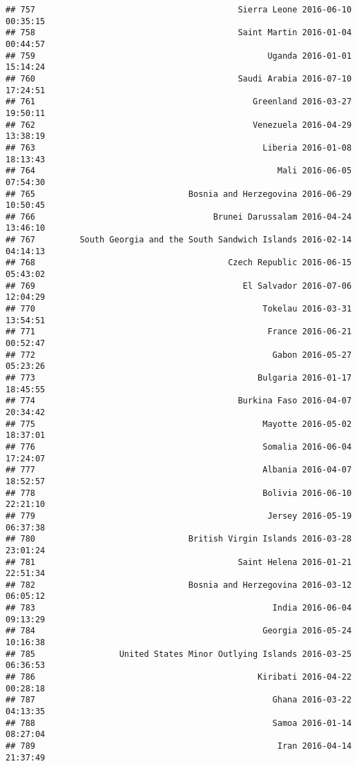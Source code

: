 \documentclass[
]{article}
\begin{document}
\begin{verbatim}
## 757                                         Sierra Leone 2016-06-10 00:35:15
## 758                                         Saint Martin 2016-01-04 00:44:57
## 759                                               Uganda 2016-01-01 15:14:24
## 760                                         Saudi Arabia 2016-07-10 17:24:51
## 761                                            Greenland 2016-03-27 19:50:11
## 762                                            Venezuela 2016-04-29 13:38:19
## 763                                              Liberia 2016-01-08 18:13:43
## 764                                                 Mali 2016-06-05 07:54:30
## 765                               Bosnia and Herzegovina 2016-06-29 10:50:45
## 766                                    Brunei Darussalam 2016-04-24 13:46:10
## 767         South Georgia and the South Sandwich Islands 2016-02-14 04:14:13
## 768                                       Czech Republic 2016-06-15 05:43:02
## 769                                          El Salvador 2016-07-06 12:04:29
## 770                                              Tokelau 2016-03-31 13:54:51
## 771                                               France 2016-06-21 00:52:47
## 772                                                Gabon 2016-05-27 05:23:26
## 773                                             Bulgaria 2016-01-17 18:45:55
## 774                                         Burkina Faso 2016-04-07 20:34:42
## 775                                              Mayotte 2016-05-02 18:37:01
## 776                                              Somalia 2016-06-04 17:24:07
## 777                                              Albania 2016-04-07 18:52:57
## 778                                              Bolivia 2016-06-10 22:21:10
## 779                                               Jersey 2016-05-19 06:37:38
## 780                               British Virgin Islands 2016-03-28 23:01:24
## 781                                         Saint Helena 2016-01-21 22:51:34
## 782                               Bosnia and Herzegovina 2016-03-12 06:05:12
## 783                                                India 2016-06-04 09:13:29
## 784                                              Georgia 2016-05-24 10:16:38
## 785                 United States Minor Outlying Islands 2016-03-25 06:36:53
## 786                                             Kiribati 2016-04-22 00:28:18
## 787                                                Ghana 2016-03-22 04:13:35
## 788                                                Samoa 2016-01-14 08:27:04
## 789                                                 Iran 2016-04-14 21:37:49

\end{verbatim}
\end{document}
